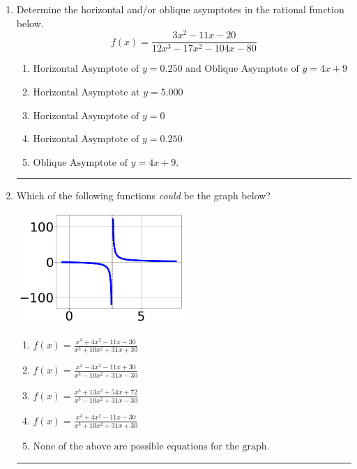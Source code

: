 \documentclass[14pt]{extbook}
\newcommand{\litem}[1]{\item#1\hspace*{-1cm}\rule{\textwidth}{0.4pt}}
\begin{document}
\begin{enumerate}
{\begin{enumerate}[label=\Alph*.]
\end{enumerate} }
\litem{
Determine the horizontal and/or oblique asymptotes in the rational function below.\[ f(x) = \frac{3x^{2} -11 x -20}{12x^{3} -17 x^{2} -104 x -80} \]\begin{enumerate}[label=\Alph*.]
\item \( \text{Horizontal Asymptote of } y = 0.250 \text{ and Oblique Asymptote of } y = 4x + 9 \)
\item \( \text{Horizontal Asymptote at } y = 5.000 \)
\item \( \text{Horizontal Asymptote of } y = 0 \)
\item \( \text{Horizontal Asymptote of } y = 0.250  \)
\item \( \text{Oblique Asymptote of } y = 4x + 9. \)

\end{enumerate} }
\litem{
Which of the following functions \textit{could} be the graph below?
\begin{center}
    \includegraphics[width=0.5\textwidth]{../Figures/identifyGraphOfRationalFunctionCopyA.png}
\end{center}
\begin{enumerate}[label=\Alph*.]
\item \( f(x)=\frac{x^{3} +4 x^{2} -11 x -30}{x^{3} +10 x^{2} +31 x + 30} \)
\item \( f(x)=\frac{x^{3} -4 x^{2} -11 x + 30}{x^{3} -10 x^{2} +31 x -30} \)
\item \( f(x)=\frac{x^{3} +13 x^{2} +54 x + 72}{x^{3} -10 x^{2} +31 x -30} \)
\item \( f(x)=\frac{x^{3} +4 x^{2} -11 x -30}{x^{3} +10 x^{2} +31 x + 30} \)
\item \( \text{None of the above are possible equations for the graph.} \)


\end{enumerate}}
\end{enumerate}
\end{document}
